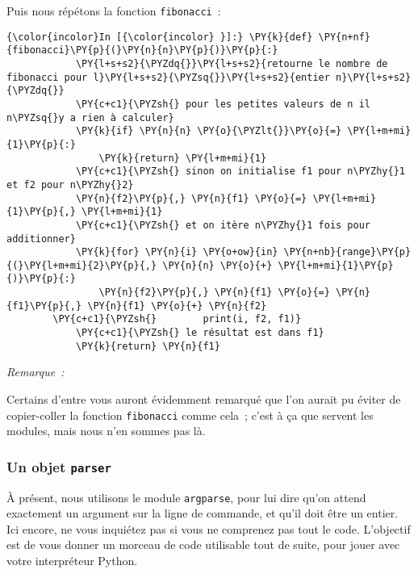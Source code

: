     Puis nous répétons la fonction \texttt{fibonacci}~:

    \begin{Verbatim}[commandchars=\\\{\}]
{\color{incolor}In [{\color{incolor} }]:} \PY{k}{def} \PY{n+nf}{fibonacci}\PY{p}{(}\PY{n}{n}\PY{p}{)}\PY{p}{:}
            \PY{l+s+s2}{\PYZdq{}}\PY{l+s+s2}{retourne le nombre de fibonacci pour l}\PY{l+s+s2}{\PYZsq{}}\PY{l+s+s2}{entier n}\PY{l+s+s2}{\PYZdq{}}
            \PY{c+c1}{\PYZsh{} pour les petites valeurs de n il n\PYZsq{}y a rien à calculer}
            \PY{k}{if} \PY{n}{n} \PY{o}{\PYZlt{}}\PY{o}{=} \PY{l+m+mi}{1}\PY{p}{:}
                \PY{k}{return} \PY{l+m+mi}{1}
            \PY{c+c1}{\PYZsh{} sinon on initialise f1 pour n\PYZhy{}1 et f2 pour n\PYZhy{}2}
            \PY{n}{f2}\PY{p}{,} \PY{n}{f1} \PY{o}{=} \PY{l+m+mi}{1}\PY{p}{,} \PY{l+m+mi}{1}
            \PY{c+c1}{\PYZsh{} et on itère n\PYZhy{}1 fois pour additionner}
            \PY{k}{for} \PY{n}{i} \PY{o+ow}{in} \PY{n+nb}{range}\PY{p}{(}\PY{l+m+mi}{2}\PY{p}{,} \PY{n}{n} \PY{o}{+} \PY{l+m+mi}{1}\PY{p}{)}\PY{p}{:}
                \PY{n}{f2}\PY{p}{,} \PY{n}{f1} \PY{o}{=} \PY{n}{f1}\PY{p}{,} \PY{n}{f1} \PY{o}{+} \PY{n}{f2}
        \PY{c+c1}{\PYZsh{}        print(i, f2, f1)}
            \PY{c+c1}{\PYZsh{} le résultat est dans f1}
            \PY{k}{return} \PY{n}{f1}
\end{Verbatim}


    \emph{Remarque~:}

Certains d'entre vous auront évidemment remarqué que l'on aurait pu
éviter de copier-coller la fonction \texttt{fibonacci} comme cela~;
c'est à ça que servent les modules, mais nous n'en sommes pas là.

    \hypertarget{un-objet-parser}{%
\subsubsection{\texorpdfstring{Un objet
\texttt{parser}}{Un objet parser}}\label{un-objet-parser}}

    À présent, nous utilisons le module \texttt{argparse}, pour lui dire
qu'on attend exactement un argument sur la ligne de commande, et qu'il
doit être un entier. Ici encore, ne vous inquiétez pas si vous ne
comprenez pas tout le code. L'objectif est de vous donner un morceau de
code utilisable tout de suite, pour jouer avec votre interpréteur
Python.

